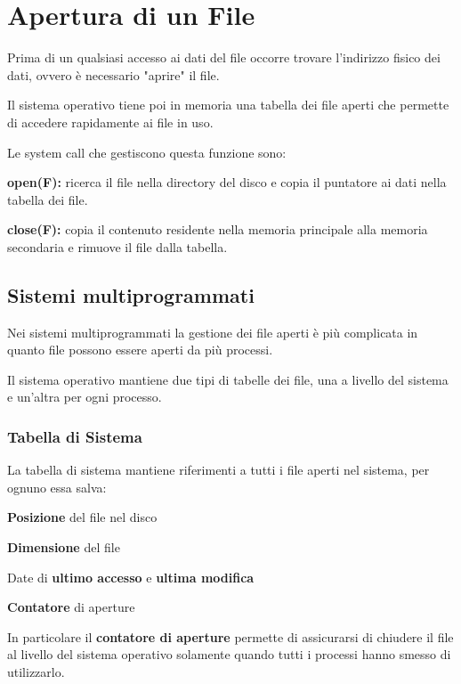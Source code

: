 \section{Apertura di un File}
Prima di un qualsiasi accesso ai dati del file occorre trovare l'indirizzo fisico dei dati, ovvero è necessario "aprire" il file.

Il sistema operativo tiene poi in memoria una tabella dei file aperti che permette di accedere rapidamente ai file in uso.

Le system call che gestiscono questa funzione sono:
\begin{sitemize}
    \item \textbf{open(F):} ricerca il file nella directory del disco e copia il puntatore ai dati nella tabella dei file.

    \item \textbf{close(F):} copia il contenuto residente nella memoria principale alla memoria secondaria e rimuove il file dalla tabella.
\end{sitemize}

\subsection{Sistemi multiprogrammati}
Nei sistemi multiprogrammati la gestione dei file aperti è più complicata in quanto file possono essere aperti da più processi.

Il sistema operativo mantiene due tipi di tabelle dei file, una a livello del sistema e un'altra per ogni processo.

\subsubsection{Tabella di Sistema}
La tabella di sistema mantiene riferimenti a tutti i file aperti nel sistema, per ognuno essa salva:

\begin{sitemize}
    \item \textbf{Posizione} del file nel disco
    \item \textbf{Dimensione} del file
    \item Date di \textbf{ultimo accesso} e \textbf{ultima modifica}
    \item \textbf{Contatore} di aperture
\end{sitemize}

\spacer
In particolare il \textbf{contatore di aperture} permette di assicurarsi di chiudere il file al livello del sistema operativo solamente quando tutti i processi hanno smesso di utilizzarlo.

